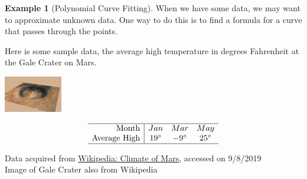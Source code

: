 \documentclass[handout]{beamer}
\theoremstyle{definition}
\newtheorem*{exa}{Example}
\begin{document}
\begin{frame}{\insertframenumber}
	\begin{exa}[Polynomial Curve Fitting]
		When we have some data, we may want to approximate unknown data.
		One way to do this is to find a formula for a curve that passes through the points.
		
		Here is some sample data, the average high temperature in degrees Fahrenheit at the Gale Crater on Mars.
		
		\begin{center}
			\includegraphics[width=1in]{images/Gale_Crater}
		\end{center}
		\[
			\begin{array}{r|ccc}
				\hline
				\textup{Month} & Jan & Mar & May\\
				\textup{Average High} & 19^{\circ } & -9^{\circ } & 25^{\circ }\\
				\hline
			\end{array}
		\]
	\end{exa}
	{\tiny Data acquired from \href{https://en.wikipedia.org/wiki/Climate_of_Mars}{Wikipedia: Climate of Mars}, accessed on 9/8/2019\\
	Image of Gale Crater also from Wikipedia}
\end{frame}
\end{document}
